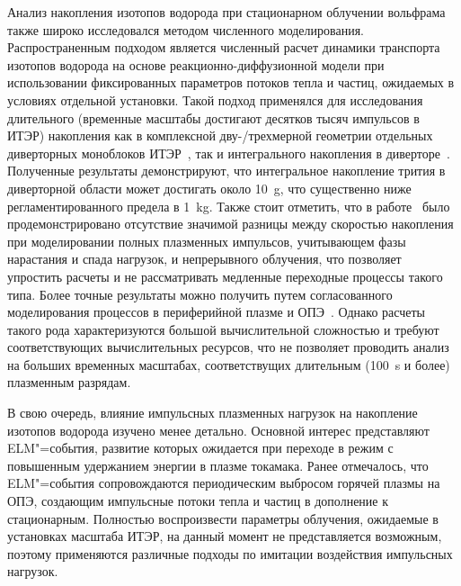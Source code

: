 Анализ накопления изотопов водорода при стационарном облучении вольфрама также широко исследовался методом численного моделирования. Распространенным подходом является численный расчет динамики транспорта изотопов водорода на основе реакционно-диффузионной модели при использовании фиксированных параметров потоков тепла и частиц, ожидаемых в условиях отдельной установки. Такой подход применялся для исследования длительного (временные масштабы достигают десятков тысяч импульсов в ИТЭР) накопления как в комплексной дву-/трехмерной геометрии отдельных диверторных моноблоков ИТЭР~\cite{Delaporte-Mathurin2019,Hodille2021_2,Delaporte-Mathurin2021}, так и интегрального накопления в диверторе~\cite{Delaporte-Mathurin2020, Delaporte-Mathurin2021_2}. Полученные результаты демонстрируют, что интегральное накопление трития в диверторной области может достигать около \SI{10}{\gram}, что существенно ниже регламентированного предела в \SI{1}{\kilogram}. Также стоит отметить, что в работе~\cite{Hodille2021_2} было продемонстрировано отсутствие значимой разницы между скоростью накопления при моделировании полных плазменных импульсов, учитывающем фазы нарастания и спада нагрузок, и непрерывного облучения, что позволяет упростить расчеты и не рассматривать медленные переходные процессы такого типа. Более точные результаты можно получить путем согласованного моделирования процессов в периферийной плазме и ОПЭ~\cite{Smirnov2020,Lasa2024,Smirnov2024}. Однако расчеты такого рода характеризуются большой вычислительной сложностью и требуют соответствующих вычислительных ресурсов, что не позволяет проводить анализ на больших временных масштабах, соответствущих длительным (\SI{100}{\second} и более) плазменным разрядам.

В свою очередь, влияние импульсных плазменных нагрузок на накопление изотопов водорода изучено менее детально. Основной интерес представляют ELM"=события, развитие которых ожидается при переходе в режим с повышенным удержанием энергии в плазме токамака. Ранее отмечалось, что ELM"=события сопровождаются периодическим выбросом горячей плазмы на ОПЭ, создающим импульсные потоки тепла и частиц в дополнение к стационарным. Полностью воспроизвести параметры облучения, ожидаемые в установках масштаба ИТЭР, на данный момент не представляется возможным, поэтому применяются различные подходы по имитации воздействия импульсных нагрузок.

